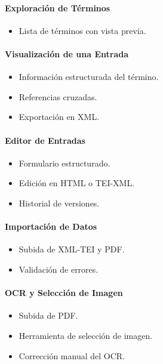 \documentclass{article}
\begin{document}
\paragraph{Exploración de Términos}
\begin{itemize}
    \item Lista de términos con vista previa.
\end{itemize}

\paragraph{Visualización de una Entrada}
\begin{itemize}
    \item Información estructurada del término.
    \item Referencias cruzadas.
    \item Exportación en XML.
\end{itemize}

\paragraph{Editor de Entradas}
\begin{itemize}
    \item Formulario estructurado.
    \item Edición en HTML o TEI-XML.
    \item Historial de versiones.
\end{itemize}

\paragraph{Importación de Datos}
\begin{itemize}
    \item Subida de XML-TEI y PDF.
    \item Validación de errores.
\end{itemize}

\paragraph{OCR y Selección de Imagen}
\begin{itemize}
    \item Subida de PDF.
    \item Herramienta de selección de imagen.
    \item Corrección manual del OCR.
\end{itemize}
\end{document}
